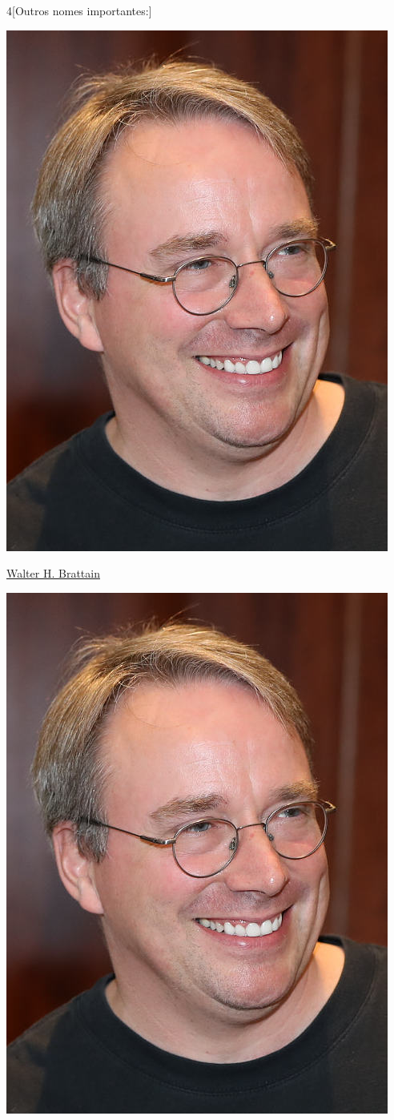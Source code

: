 \begin{multicols}{4}[Outros nomes importantes:]
\begin{center}
					\includegraphics[width=.8\columnwidth]{./IMG-GIT/CIENTISTAS/linus.jpeg}
\end{center}
				
\vfill\null
\columnbreak				
				
				\href{https://pt.wikipedia.org/wiki/Walter_H._Brattain}{Walter H. Brattain}
				
\begin{center}
					\includegraphics[width=.8\columnwidth]{./IMG-GIT/CIENTISTAS/linus.jpeg}
\end{center}
				

\end{multicols}
